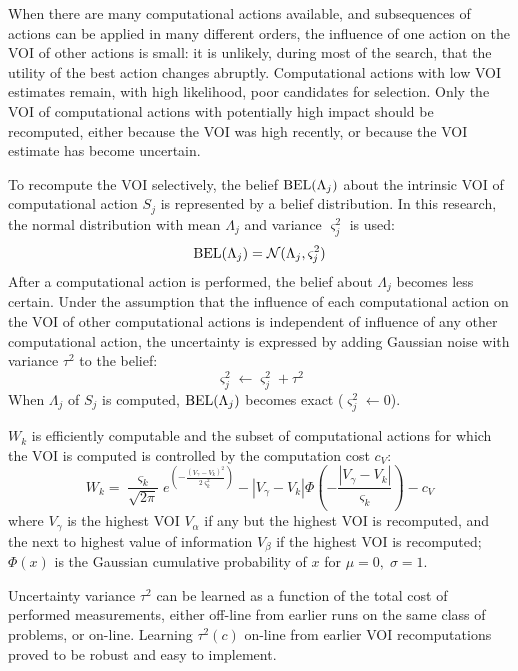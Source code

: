 When there are many computational actions available, and subsequences
of actions can be applied in many different orders, the influence
of one action on the VOI of other actions is small: it is unlikely,
during most of the search, that the utility of the best action
changes abruptly. Computational actions with low VOI estimates remain,
with high likelihood, poor candidates for selection. Only the VOI of
computational actions with potentially high impact should be
recomputed, either because the VOI was high recently, or because the
VOI estimate has become uncertain.

To recompute the VOI selectively, the belief $\mathop{\mathrm{BEL}}(\Lambda_j)$ about
the intrinsic VOI of computational action $S_j$ is represented by a belief
distribution. In this research, the normal distribution with mean
$\Lambda_j$ and variance $\varsigma_j^2$ is used:
\begin{equation}
\mathop{\mathrm{BEL}}(\Lambda_j)=\mathcal{N}(\Lambda_j, \varsigma_j^2)
\end{equation}
After a computational action is performed, the belief about
$\Lambda_j$ becomes less certain. Under the assumption that the
influence of each computational action on the VOI of other
computational actions is independent of influence of any other
computational action, the uncertainty is expressed by adding Gaussian
noise with variance $\tau^2$ to the belief:
\begin{equation}
\varsigma_j^2 \leftarrow \varsigma_j^2+\tau^2
\label{eq:varsigma}
\end{equation}
When $\Lambda_j$ of $S_j$ is computed, $\mathop{\mathrm{BEL}}(\Lambda_j)$
becomes exact ($\varsigma_j^2 \leftarrow 0$).

$W_k$ is efficiently computable
and the subset of computational actions for which the VOI is computed is
controlled by the computation cost $c_V$:
\begin{equation}
\label{eq:rational-w}
W_k=\frac {\varsigma_k} {\sqrt {2\pi}}
   e^{\left(-\frac {\left(V_\gamma-V_k\right)^2}
         {2\varsigma_k^2}\right)}
   -\left|V_\gamma-V_k\right|\Phi\left(-\frac {\left|V_\gamma-V_k\right|} {\varsigma_k} \right)-c_V
\end{equation}
where $V_\gamma$ is the highest VOI $V_\alpha$ if any but the highest
VOI is recomputed, and the next to highest value of information $V_\beta$ if the
highest VOI is recomputed; $\Phi(x)$ is the Gaussian cumulative
probability of $x$ for $\mu=0,\;\sigma=1$.

Uncertainty variance $\tau^2$ can be learned as a function of the
total cost of performed measurements, either off-line from earlier
runs on the same class of problems, or on-line. Learning $\tau^2(c)$ on-line from
earlier VOI recomputations  proved to be robust and easy to implement.

